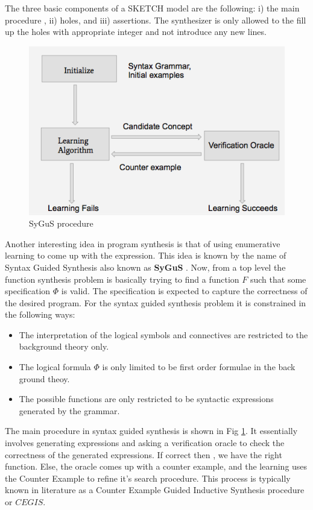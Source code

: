 \documentclass{article}
\begin{document}
The three basic components of a SKETCH model are the following: i) the main
procedure , ii) holes, and iii) assertions.  The synthesizer is only allowed to
the fill up the holes with appropriate integer and not introduce any new lines. 

\begin{figure}[h]
  \centering
  \includegraphics[scale = 0.6]{workflow.png}
  \caption{SyGuS procedure \cite{sygus}}
  \label{sygus_fig}
\end{figure}

Another interesting idea in program synthesis is that of using enumerative
learning to come up with the expression. This idea is known by the name of
Syntax Guided Synthesis also known as \textbf{SyGuS} \cite{sygus}. Now, from a
top level the function synthesis problem is basically trying to find a function
$F$ such that some specification $\Phi$ is valid. The specification is expected
to capture the correctness of the desired program. For the syntax guided
synthesis problem it is constrained in the following ways:

\begin{itemize}
    \item The interpretation of the logical symbols and connectives
	are restricted to the background theory only.
    \item The logical formula $\Phi$ is only limited to be first order formulae in
	the back ground theoy.
    \item The possible functions are only restricted to be syntactic expressions
	generated by the grammar.
\end{itemize}

The main procedure in syntax guided synthesis is shown in Fig \ref{sygus_fig}.  
It essentially involves generating expressions and asking a verification oracle
to check the correctness of the generated expressions. If correct then , we
have the right function. Else, the oracle comes up with a counter example, and
the learning uses the Counter Example to refine it's search procedure. This
process is typically known in literature as a Counter Example Guided Inductive
Synthesis procedure or $CEGIS$.
\end{document}
